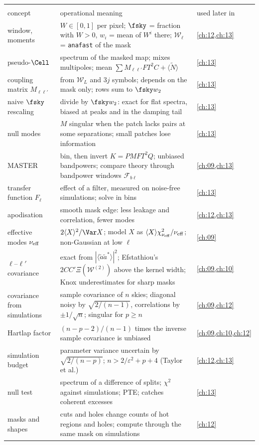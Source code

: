 \begin{center}
\small
\renewcommand{\arraystretch}{1.15}
\begin{tabularx}{\linewidth}{@{}>{\raggedright\arraybackslash}p{3.3cm}
                               >{\raggedright\arraybackslash}X
                               >{\raggedright\arraybackslash}p{2.5cm}@{}}
\toprule
\multicolumn{3}{@{}l}{\textbf{The cut sky}}\\
concept & operational meaning & used later in\\\midrule
window, moments & $W\in[0,1]$ per pixel; $\fsky$ = fraction with $W>0$, $w_i$ = mean of $W^i$ there; $\mathcal W_\ell$ = \texttt{anafast} of the mask & \cref{ch:12,ch:13}\\
pseudo-$\Cell$ & spectrum of the masked map; mixes multipoles; mean $\sum M_{\ell\ell'}F T^2 C+\langle\widetilde N\rangle$ & \cref{ch:13}\\
coupling matrix $M_{\ell\ell'}$ & from $\mathcal W_L$ and $3j$ symbols; depends on the mask only; rows sum to $\fsky w_2$ & \cref{ch:13}\\
naive $\fsky$ rescaling & divide by $\fsky w_2$: exact for flat spectra, biased at peaks and in the damping tail & \cref{ch:13}\\
null modes & $M$ singular when the patch lacks pairs at some separations; small patches lose information & \cref{ch:13}\\
MASTER & bin, then invert $K=PMFT^2Q$; unbiased bandpowers; compare theory through bandpower windows $\mathcal F_{b\ell}$ & \cref{ch:09,ch:13}\\
transfer function $F_\ell$ & effect of a filter, measured on noise-free simulations; solve in bins & \cref{ch:13}\\
apodisation & smooth mask edge: less leakage and correlation, fewer modes & \cref{ch:12,ch:13}\\
effective modes $\nu_{\rm eff}$ & $2\langle X\rangle^2/\Var X$; model $X$ as $\langle X\rangle\chi^2_{\nu_{\rm eff}}/\nu_{\rm eff}$; non-Gaussian at low $\ell$ & \cref{ch:09}\\
$\ell$--$\ell'$ covariance & exact from $|\langle\tilde a\tilde a^*\rangle|^2$; Efstathiou's $2CC'\Xi(\mathcal W^{(2)})$ above the kernel width; Knox underestimates for sharp masks & \cref{ch:09,ch:10}\\
covariance from simulations & sample covariance of $n$ skies; diagonal noisy by $\sqrt{2/(n-1)}$, correlations by $\pm1/\sqrt n$; singular for $p\ge n$ & \cref{ch:09,ch:12}\\
Hartlap factor & $(n-p-2)/(n-1)$ times the inverse sample covariance is unbiased & \cref{ch:09,ch:10,ch:12}\\
simulation budget & parameter variance uncertain by $\sqrt{2/(n-p)}$; $n>2/\varepsilon^2+p+4$ (Taylor et al.) & \cref{ch:12,ch:13}\\
null test & spectrum of a difference of splits; $\chi^2$ against simulations; PTE; catches coherent excesses & \cref{ch:13}\\
masks and shapes & cuts and holes change counts of hot regions and holes; compute through the same mask on simulations & \cref{ch:12}\\
\bottomrule
\end{tabularx}
\end{center}
  